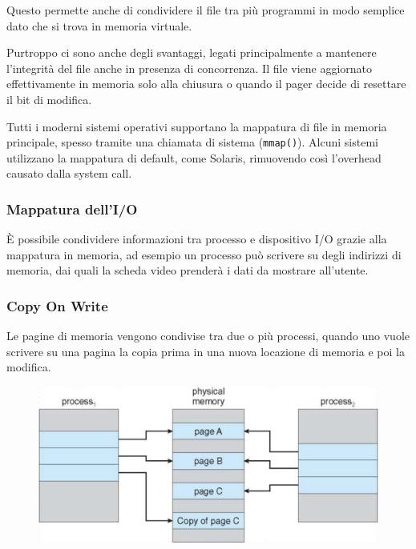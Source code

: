 \spacer
Questo permette anche di condividere il file tra più programmi in modo semplice dato che si trova in memoria virtuale.

Purtroppo ci sono anche degli svantaggi, legati principalmente a mantenere l'integrità del file anche in presenza di concorrenza.
\spacer
Il file viene aggiornato effettivamente in memoria solo alla chiusura o quando il pager decide di resettare il bit di modifica.

\spacer
Tutti i moderni sistemi operativi supportano la mappatura di file in memoria principale, spesso tramite una chiamata di sistema (\texttt{mmap()}).
Alcuni sistemi utilizzano la mappatura di default, come Solaris, rimuovendo così l'overhead causato dalla system call.

\subsubsection{Mappatura dell'I/O}
È possibile condividere informazioni tra processo e dispositivo I/O grazie alla mappatura in memoria, ad esempio un processo può scrivere su degli indirizzi di memoria, dai quali la scheda video prenderà i dati da mostrare all'utente.

\subsubsection{Copy On Write}
Le pagine di memoria vengono condivise tra due o più processi, quando uno vuole scrivere su una pagina la copia prima in una nuova locazione di memoria e poi la modifica.

\begin{figure}[H]
    \centering
    \includegraphics[width=0.5\linewidth]{assets/copy-on-write.png}
\end{figure}
